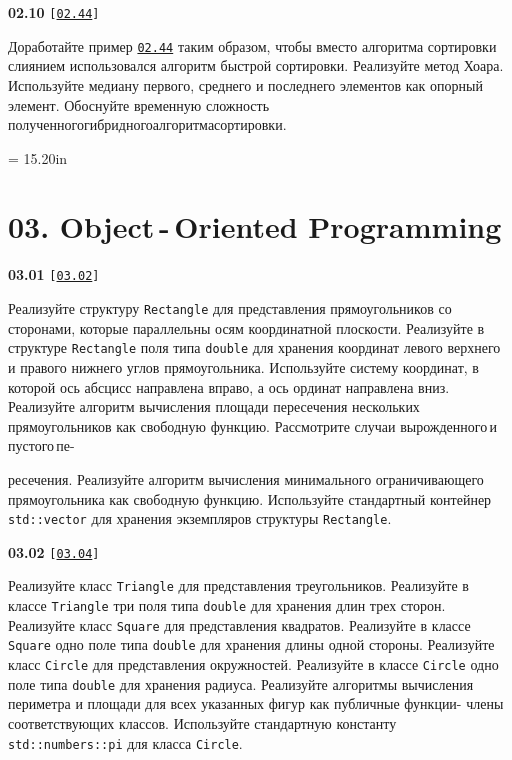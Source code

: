\documentclass[a4paper,12pt]{article}
\begin{document}
\bigskip

{\large \textbf{02.10} \texttt{[\href{https://github.com/i-s-m-mipt/Education/blob/master/projects/examples/source/02.44.cpp}{\texttt{02.44}}]}}

\bigskip

Доработайте пример \href{https://github.com/i-s-m-mipt/Education/blob/master/projects/examples/source/02.44.cpp}{\texttt{02.44}} таким образом, чтобы вместо алгоритма сортировки слиянием использовался алгоритм быстрой сортировки. Реализуйте метод Хоара. Используйте медиану первого, среднего и последнего элементов как опорный элемент. Обоснуйте временную сложность полученного\;гибридного\;алгоритма\;сортировки.



\newpage\thispagestyle{empty}\pdfpageheight = 15.20in\enlargethispage{100in}

\section{03. Object\,-\,Oriented Programming}

{\large \textbf{03.01} \texttt{[\href{https://github.com/i-s-m-mipt/Education/blob/master/projects/examples/source/03.02.cpp}{\texttt{03.02}}]}}

\bigskip

Реализуйте структуру \lstinline{Rectangle} для представления прямоугольников со сторонами, которые параллельны осям координатной плоскости. Реализуйте в структуре \lstinline{Rectangle} поля типа \lstinline{double} для хранения координат левого верхнего и правого нижнего углов прямоугольника. Используйте систему координат, в которой ось абсцисс направлена вправо, а ось ординат направлена вниз. Реализуйте алгоритм вычисления площади пересечения нескольких прямоугольников как свободную функцию. Рассмотрите случаи вырожденного\,и\,пустого\,пе- 

ресечения. Реализуйте алгоритм вычисления минимального ограничивающего прямоугольника как свободную функцию. Используйте стандартный контейнер \lstinline{std::vector} для хранения экземпляров структуры \lstinline{Rectangle}.

\bigskip

{\large \textbf{03.02} \texttt{[\href{https://github.com/i-s-m-mipt/Education/blob/master/projects/examples/source/03.04.cpp}{\texttt{03.04}}]}}

\bigskip

Реализуйте класс \lstinline{Triangle} для представления треугольников. Реализуйте в классе \lstinline{Triangle} три поля типа \lstinline{double} для хранения длин трех сторон. Реализуйте класс \lstinline{Square} для представления квадратов. Реализуйте в классе \lstinline{Square} одно поле типа \lstinline{double} для хранения длины одной стороны. Реализуйте класс \lstinline{Circle} для представления окружностей. Реализуйте в классе \lstinline{Circle} одно поле типа \lstinline{double} для хранения радиуса. Реализуйте алгоритмы вычисления периметра и площади для всех указанных фигур как публичные функции- члены соответствующих классов. Используйте стандартную константу \lstinline{std::numbers::pi} для класса \lstinline{Circle}.
\end{document}
